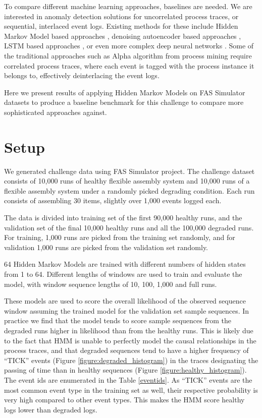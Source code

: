 \documentclass[journal]{IEEEtran}
\begin{document}
To compare different machine learning approaches, baselines are needed. We are interested in anomaly detection solutions for uncorrelated process traces, or sequential, interlaced event logs. Existing methods for these include Hidden Markov Model based approaches \cite{gornitz2015hidden}\cite{joshi2005investigating}, denoising autoencoder based approaches \cite{nolle2016unsupervised}, LSTM based approaches \cite{yuan2021recompose}\cite{du2017deeplog}, or even more complex deep neural networks \cite{zhang2019robust}. Some of the traditional approaches such as Alpha algorithm from process mining require correlated process traces, where each event is tagged with the process instance it belongs to, effectively deinterlacing the event logs.

Here we present results of applying Hidden Markov Models on FAS Simulator datasets to produce a baseline benchmark for this challenge to compare more sophisticated approaches against.

\section{Setup}

We generated challenge data using FAS Simulator project\cite{FASSimulator}. The challenge dataset consists of 10,000 runs of healthy flexible assembly system and 10,000 runs of a flexible assembly system under a randomly picked degrading condition. Each run consists of assembling 30 items, slightly over 1,000 events logged each.

The data is divided into training set of the first 90,000 healthy runs, and the validation set of the final 10,000 healthy runs and all the 100,000 degraded runs. For training, 1,000 runs are picked from the training set randomly, and for validation 1,000 runs are picked from the validation set randomly.

64 Hidden Markov Models are trained with different numbers of hidden states from 1 to 64. Different lengths of windows are used to train and evaluate the model, with window sequence lengths of 10, 100, 1,000 and full runs.

These models are used to score the overall likelihood of the observed sequence window assuming the trained model for the validation set sample sequences. In practice we find that the model tends to score sample sequences from the degraded runs higher in likelihood than from the healthy runs. This is likely due to the fact that HMM is unable to perfectly model the causal relationships in the process traces, and that degraded sequences tend to have a higher frequency of ``TICK'' events (Figure \ref{figure:degraded_histogram}) in the traces designating the passing of time than in healthy sequences (Figure \ref{figure:healthy_histogram}). The event ids are enumerated in the Table \ref{eventids}. As ``TICK'' events are the most common event type in the training set as well, their respective probability is very high compared to other event types. This makes the HMM score healthy logs  lower than degraded logs.
\end{document}

